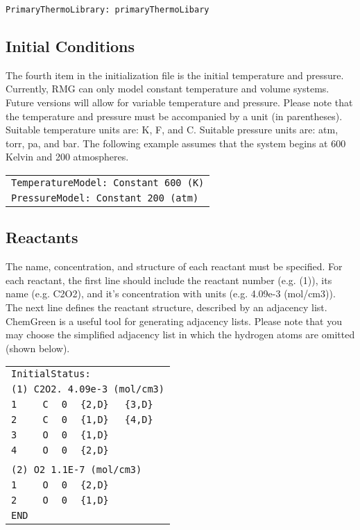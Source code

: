 \documentclass[12pt,letterpaper]{article}
\begin{document}
\texttt{PrimaryThermoLibrary: primaryThermoLibary}

\subsection{Initial Conditions}

The fourth item in the initialization file is the initial temperature and pressure.
Currently, RMG can only model constant temperature and volume
systems. Future versions will allow for variable temperature and pressure.
Please note that the temperature and pressure must be accompanied by a
unit (in parentheses). Suitable temperature units are: K, F, and C. Suitable
pressure units are: atm, torr, pa, and bar. The following example assumes
that the system begins at 600 Kelvin and 200 atmospheres. \\

\begin{tabular}{l}
\texttt{TemperatureModel: Constant 600 (K)} \\
\texttt{PressureModel: Constant 200 (atm)}
\end{tabular}

\subsection{Reactants}

The name, concentration, and structure of each reactant must be specified.
For each reactant, the first line should include the reactant number (e.g.
(1)), its name (e.g. C2O2), and it's concentration with units (e.g. 4.09e-3
(mol/cm3)). The next line defines the reactant structure, described by an
adjacency list. ChemGreen is a useful tool for generating adjacency lists.
Please note that you may choose the simplified adjacency list in which the
hydrogen atoms are omitted (shown below). \\


\begin{tabular}{lllll}
\multicolumn{5}{l}{\texttt{InitialStatus:}} \\
\multicolumn{5}{l}{\texttt{(1) C2O2. 4.09e-3 (mol/cm3)}} \\
\texttt{1}   & \texttt{C} & \texttt{0} & \texttt{\{2,D\}} & \texttt{\{3,D\} }\\
\texttt{2}   & \texttt{C} & \texttt{0} & \texttt{\{1,D\}} & \texttt{\{4,D\} } \\
\texttt{3}   & \texttt{O} & \texttt{0} & \texttt{\{1,D\}} &\\
\texttt{4}   & \texttt{O} & \texttt{0} & \texttt{\{2,D\}} & \\
& & & & \\
\multicolumn{5}{l}{\texttt{(2) O2 1.1E-7 (mol/cm3) }}\\
\texttt{1} & \texttt{O} & \texttt{0} & \texttt{\{2,D\}} & \\
\texttt{2} & \texttt{O} & \texttt{0} & \texttt{\{1,D\}} & \\
\texttt{END} \\
\end{tabular} \\
\end{document}
